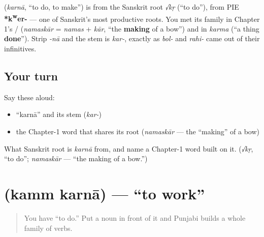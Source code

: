 \begin{cousinweb}
\textbf{} (\emph{karnā}, \textquotedblleft{}to do, to make\textquotedblright{}) is from the Sanskrit root \emph{√kṛ} (\textquotedblleft{}to do\textquotedblright{}), from PIE \textbf{*k\textsuperscript{w}er-} — one of Sanskrit's most productive roots. You met its family in Chapter 1's \textbf{}/\textbf{} (\emph{namaskār} = \emph{namas} + \emph{kār}, \textquotedblleft{}the \textbf{making} of a bow\textquotedblright{}) and in \emph{karma} (\textquotedblleft{}a thing \textbf{done}\textquotedblright{}). Strip \emph{-nā} and the stem is \emph{kar-}, exactly as \emph{bol-} and \emph{rahi-} came out of their infinitives.
\end{cousinweb}

\subsection*{Your turn}
Say these aloud:

\begin{itemize}
\raggedright
  \item \textquotedblleft{}karnā\textquotedblright{} and its stem (\emph{kar-})
  \item the Chapter-1 word that shares its root (\emph{namaskār} — the \textquotedblleft{}making\textquotedblright{} of a bow)
\end{itemize}

\begin{tcolorbox}[breakable,colback=teal!4,colframe=teal!35!black,title={Before you move on}]
What Sanskrit root is \emph{karnā} from, and name a Chapter-1 word built on it. (\emph{√kṛ}, \textquotedblleft{}to do\textquotedblright{}; \emph{namaskār} — \textquotedblleft{}the making of a bow.\textquotedblright{})
\end{tcolorbox}
\section[\texorpdfstring{\pa{ਕੰਮ} \pa{ਕਰਨਾ} (kamm karnā)}{ਕੰਮ ਕਰਨਾ (kamm karnā)}]{  (kamm karnā) — \textquotedblleft{}to work\textquotedblright{}}

\label{lesson:PA-C05-kamm-karna}



\begin{quote}
You have \textquotedblleft{}to do.\textquotedblright{} Put a noun in front of it and Punjabi builds a whole family of verbs.
\end{quote}

